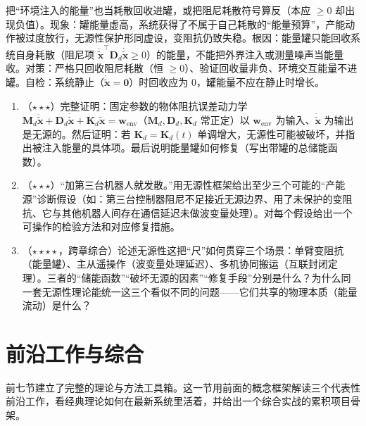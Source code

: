 \begin{pitfall}
把“环境注入的能量”也当耗散回收进罐，或把阻尼耗散符号算反（本应 $\ge 0$ 却出现负值）。现象：罐能量虚高，系统获得了不属于自己耗散的“能量预算”，产能动作被过度放行，无源性保护形同虚设，变阻抗仍致失稳。根因：能量罐只能回收系统自身耗散（阻尼项 $\dot{\tilde{\mathbf{x}}}^\top\mathbf{D}_d\dot{\tilde{\mathbf{x}}}\ge 0$）的能量，不能把外界注入或测量噪声当能量收。对策：严格只回收阻尼耗散（恒 $\ge 0$）、验证回收量非负、环境交互能量不进罐。自检：系统静止（$\dot{\tilde{\mathbf{x}}}=\mathbf{0}$）时回收应为 $0$，罐能量不应在静止时增长。
\end{pitfall}

\begin{practice}
\begin{enumerate}
  \item （$\star\star\star$）完整证明：固定参数的物体阻抗误差动力学 $\mathbf{M}_d\ddot{\tilde{\mathbf{x}}}+\mathbf{D}_d\dot{\tilde{\mathbf{x}}}+\mathbf{K}_d\tilde{\mathbf{x}}=\mathbf{w}_{\text{env}}$（$\mathbf{M}_d,\mathbf{D}_d,\mathbf{K}_d$ 常正定）以 $\mathbf{w}_{\text{env}}$ 为输入、$\dot{\tilde{\mathbf{x}}}$ 为输出是无源的。然后证明：若 $\mathbf{K}_d=\mathbf{K}_d(t)$ 单调增大，无源性可能被破坏，并指出被注入能量的具体项。最后说明能量罐如何修复（写出带罐的总储能函数）。
  \item （$\star\star\star$）“加第三台机器人就发散。”用无源性框架给出至少三个可能的“产能源”诊断假设（如：第三台控制器阻尼不足接近无源边界、用了未保护的变阻抗、它与其他机器人间存在通信延迟未做波变量处理）。对每个假设给出一个可操作的检验方法和对应修复措施。
  \item （$\star\star\star\star$，跨章综合）论述无源性这把“尺”如何贯穿三个场景：单臂变阻抗（能量罐）、主从遥操作（波变量处理延迟）、多机协同搬运（互联封闭定理）。三者的“储能函数”“破坏无源的因素”“修复手段”分别是什么？为什么同一套无源性理论能统一这三个看似不同的问题——它们共享的物理本质（能量流动）是什么？
\end{enumerate}
\end{practice}

\section{前沿工作与综合}
\label{sec:cm-frontier}

前七节建立了完整的理论与方法工具箱。这一节用前面的概念框架解读三个代表性前沿工作，看经典理论如何在最新系统里活着，并给出一个综合实战的累积项目骨架。

